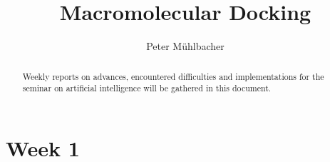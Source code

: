 \documentclass[12pt]{report}
\title{Macromolecular Docking}
\author{Peter M\"uhlbacher}
\theoremstyle{definition}\newtheorem*{definition}{Definition}
\theoremstyle{definition}\newtheorem*{remark}{Remark}
\begin{document}
\maketitle
\tableofcontents

\begin{abstract}
Weekly reports on advances, encountered difficulties and implementations for the seminar on artificial intelligence will be gathered in this document.
\end{abstract}

\chapter{Week 1}




\end{document}
